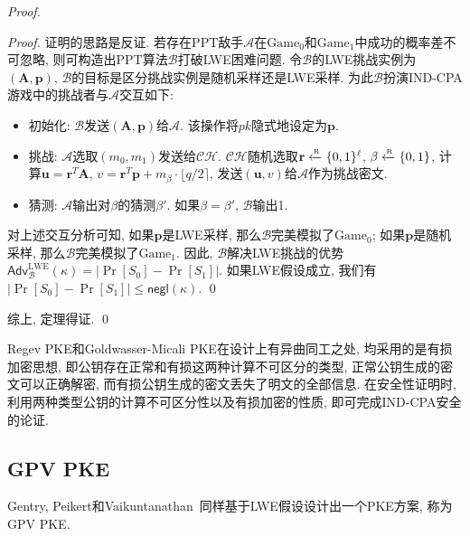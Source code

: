 \begin{proof}
\begin{proof}
证明的思路是反证. 若存在PPT敌手$\mathcal{A}$在$\text{Game}_0$和$\text{Game}_1$中成功的概率差不可忽略, 
则可构造出PPT算法$\mathcal{B}$打破LWE困难问题. 令$\mathcal{B}$的LWE挑战实例为$(\mathbf{A}, \mathbf{p})$, 
$\mathcal{B}$的目标是区分挑战实例是随机采样还是LWE采样. 为此$\mathcal{B}$扮演IND-CPA游戏中的挑战者与$\mathcal{A}$交互如下: 
\begin{itemize}
	\item 初始化: $\mathcal{B}$发送$(\mathbf{A}, \mathbf{p})$给$\mathcal{A}$. 
		该操作将$pk$隐式地设定为$\mathbf{p}$. 

	\item 挑战: $\mathcal{A}$选取$(m_0, m_1)$发送给$\mathcal{CH}$. 
		$\mathcal{CH}$随机选取$\mathbf{r} \xleftarrow{\textup{\tiny R}} \{0,1\}^\ell$, $\beta \xleftarrow{\textup{\tiny R}} \{0,1\}$,  
		计算$\mathbf{u} = \mathbf{r}^T \mathbf{A}$, 
		$v = \mathbf{r}^T \mathbf{p} + m_\beta \cdot \lfloor q/2 \rceil$, 
		发送$(\mathbf{u}, v)$给$\mathcal{A}$作为挑战密文. 

	\item 猜测: $\mathcal{A}$输出对$\beta$的猜测$\beta'$. 如果$\beta = \beta'$, $\mathcal{B}$输出1. 
\end{itemize} 
对上述交互分析可知, 如果$\mathbf{p}$是LWE采样, 那么$\mathcal{B}$完美模拟了$\text{Game}_0$; 
如果$\mathbf{p}$是随机采样, 那么$\mathcal{B}$完美模拟了$\text{Game}_1$. 
因此, $\mathcal{B}$解决LWE挑战的优势$\mathsf{Adv}_\mathcal{B}^\text{LWE}(\kappa) = |\Pr[S_0] - \Pr[S_1]|$. 
如果LWE假设成立, 我们有$|\Pr[S_0] - \Pr[S_1]| \leq \mathsf{negl}(\kappa)$. \qed
\end{proof}
综上, 定理得证. \qed
\end{proof}

\begin{remark}
Regev PKE和Goldwasser-Micali PKE在设计上有异曲同工之处, 均采用的是有损加密思想, 即公钥存在正常和有损这两种计算不可区分的类型, 
正常公钥生成的密文可以正确解密, 而有损公钥生成的密文丢失了明文的全部信息. 
在安全性证明时, 利用两种类型公钥的计算不可区分性以及有损加密的性质, 即可完成IND-CPA安全的论证.   
\end{remark}

\subsection{GPV PKE}
Gentry, Peikert和Vaikuntanathan~\cite{GPV-STOC-2008}同样基于LWE假设设计出一个PKE方案, 称为GPV PKE. 

